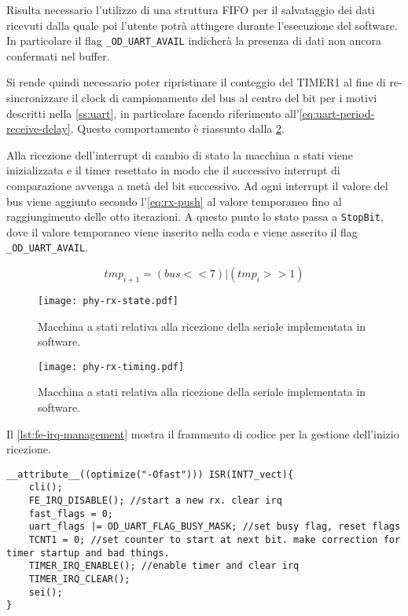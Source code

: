 Risulta necessario l'utilizzo di una struttura FIFO per il salvataggio dei dati ricevuti dalla quale poi l'utente potrà attingere durante l'esecuzione del software. In particolare il flag \texttt{\_OD\_UART\_AVAIL} indicherà la presenza di dati non ancora confermati nel buffer.

Si rende quindi necessario poter ripristinare il conteggio del TIMER1 al fine di re-sincronizzare il clock di campionamento del bus al centro del bit per i motivi descritti nella \cref{ss:uart}, in particolare facendo riferimento all'\cref{eq:uart-period-receive-delay}. Questo comportamento è riassunto dalla \cref{fig:phy-rx-timing}.

Alla ricezione dell'interrupt di cambio di stato la macchina a stati viene inizializzata e il timer resettato in modo che il successivo interrupt di comparazione avvenga a metà del bit successivo. Ad ogni interrupt il valore del bus viene aggiunto secondo l'\cref{eq:rx-push} al valore temporaneo fino al raggiungimento delle otto iterazioni. A questo punto lo stato passa a \texttt{StopBit}, dove il valore temporaneo viene inserito nella coda e viene asserito il flag \texttt{\_OD\_UART\_AVAIL}.

\begin{equation}\label{eq:rx-push}
    tmp_{i+1} = (bus << 7) | (tmp_i >> 1)
\end{equation}

\begin{figure}[p]
    \centering
    \texttt{[image: phy-rx-state.pdf]}
    \caption[]{Macchina a stati relativa alla ricezione della seriale implementata in software.}\label{fig:phy-rx-state}
\end{figure}

\begin{figure}[p]
    \centering
    \texttt{[image: phy-rx-timing.pdf]}
    \caption[]{Macchina a stati relativa alla ricezione della seriale implementata in software.}\label{fig:phy-rx-timing}
\end{figure}

Il \cref{lst:fe-irq-management} mostra il frammento di codice per la gestione dell'inizio ricezione. 

\noindent\begin{minipage}{\textwidth}
    \begin{lstlisting}[style=C, caption={IRQ di gestione inizio trasmissione}, label=lst:fe-irq-management]
__attribute__((optimize("-Ofast"))) ISR(INT7_vect){
    cli();
    FE_IRQ_DISABLE(); //start a new rx. clear irq
    fast_flags = 0;
    uart_flags |= OD_UART_FLAG_BUSY_MASK; //set busy flag, reset flags
    TCNT1 = 0; //set counter to start at next bit. make correction for timer startup and bad things.
    TIMER_IRQ_ENABLE(); //enable timer and clear irq
    TIMER_IRQ_CLEAR();
    sei();
}
    \end{lstlisting}
\end{minipage}

